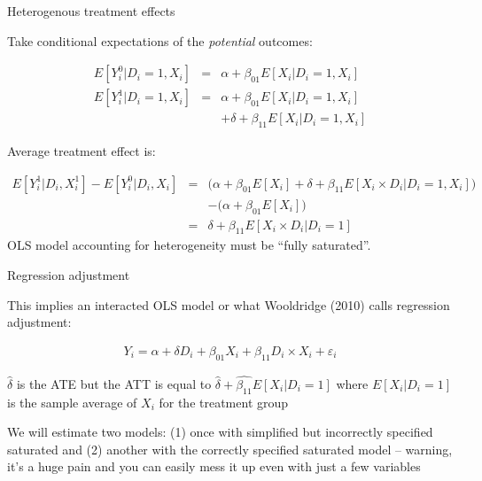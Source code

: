 \documentclass{beamer}
\begin{document}
\begin{frame}{Heterogenous treatment effects}

Take conditional expectations of the \emph{potential} outcomes:

\begin{eqnarray*}
E[Y^0_i | D_i=1, X_i] &=& \alpha + \beta_{01} E[X_i | D_i = 1, X_i] \\
E[Y^1_i | D_i=1, X_i] &=& \alpha + \beta_{01} E[X_i | D_i = 1, X_i]  \\
&& + \delta + \beta_{11} E[X_i | D_i=1,X_i]
\end{eqnarray*}

\bigskip

Average treatment effect is: 

\bigskip

\footnotesize

\begin{eqnarray*}
E[Y_i^1 | D_i, X^1_i] - E[Y^0_i | D_i, X_i] &=& \bigg (  \alpha + \beta_{01} E[X_i] + \delta + \beta_{11} E[X_i \times D_i | D_i=1,X_i] \bigg ) \\
&& -  \bigg (\alpha + \beta_{01} E[X_i] \bigg ) \\
&=& \delta + \beta_{11}  E[X_i \times D_i | D_i=1] 
\end{eqnarray*}OLS model accounting for heterogeneity must be ``fully saturated''.


\end{frame}




\begin{frame}{Regression adjustment}

This implies an interacted OLS model or what Wooldridge (2010) calls regression adjustment:

\bigskip

\begin{eqnarray*}
Y_i = \alpha + \delta D_i + \beta_{01} X_i + \beta_{11} D_i \times X_i + \varepsilon_i
\end{eqnarray*}

$\widehat{\delta}$ is the ATE but the ATT is equal to $\widehat{\delta} + \widehat{\beta_{11}} E[X_i | D_i = 1]$ where $E[X_i | D_i=1]$ is the sample average of $X_i$ for the treatment group

\bigskip

We will estimate two models: (1) once with simplified but incorrectly specified saturated and (2) another with the correctly specified saturated model -- warning, it's a huge pain and you can easily mess it up even with just a few variables

\end{frame}
\end{document}
